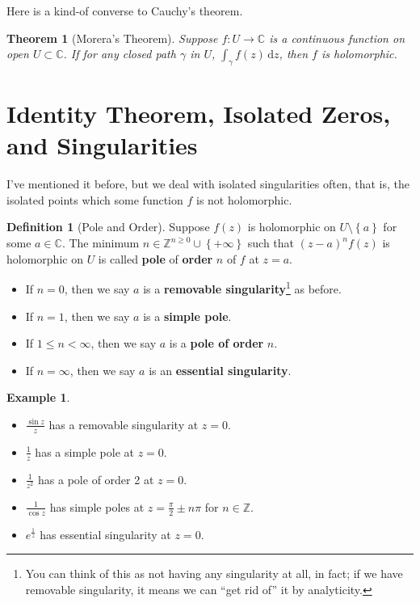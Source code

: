 \documentclass[a4paper, 12pt]{article}
\newtheorem{theorem}{Theorem}
\theoremstyle{definition}
\newtheorem{definition}{Definition}
\newtheorem{example}{Example}
\numberwithin{theorem}{section}
\numberwithin{definition}{section}
\numberwithin{exercise}{section}
\numberwithin{remark}{section}
\numberwithin{figure}{section}
\numberwithin{example}{section}
\newcommand{\C}{\mathbb{C}}
\newcommand{\intd}{\,\text{d}}
\begin{document}
Here is a kind-of converse to Cauchy's theorem.
\begin{theorem}[Morera's Theorem]
    Suppose $f:U \rightarrow \C$ is a continuous function on open $U \subset \C$.
    If for any closed path $\gamma$ in $U$, $\int_{\gamma} f(z) \intd z$,
    then $f$ is holomorphic.
\end{theorem}

\section{Identity Theorem, Isolated Zeros, and Singularities}
I've mentioned it before, but we deal with isolated singularities often,
that is, the isolated points which some function $f$ is not holomorphic.
\begin{definition}[Pole and Order]
    Suppose $f(z)$ is holomorphic on $U \setminus \left\{ a \right\}$ for some $a \in \C$.
    The minimum $n \in \mathbb{Z}^{n \geq 0} \cup \left\{ +\infty \right\}$ such that $\left( z-a \right)^{n} f(z)$ is holomorphic on $U$ is called \textbf{pole} of \textbf{order} $n$ of $f$ at $z=a$.
    \begin{itemize}
        \item If $n = 0$, then we say $a$ is a \textbf{removable singularity}\footnote{You can think of this as not having any singularity at all, in fact; if we have removable singularity, it means we can ``get rid of'' it by analyticity.} as before.
        \item If $n = 1$, then we say $a$ is a \textbf{simple pole}.
        \item If $1 \leq n < \infty$, then we say $a$ is a \textbf{pole of order} $n$.
        \item If $n = \infty$, then we say $a$ is an \textbf{essential singularity}.
    \end{itemize}
\end{definition}
\begin{example}
    \begin{itemize}
        \item $\frac{\sin {z}}{z}$ has a removable singularity at $z=0$.
        \item $\frac{1}{z}$ has a simple pole at $z=0$.
        \item $\frac{1}{z^2}$ has a pole of order 2 at $z=0$.
        \item $\frac{1}{\cos{z}}$ has simple poles at $z = \frac{\pi}{2} \pm n \pi$ for $n \in \mathbb{Z}$.
        \item $e^{\frac{1}{z}}$ has essential singularity at $z = 0$.
    \end{itemize}
\end{example}
\end{document}
